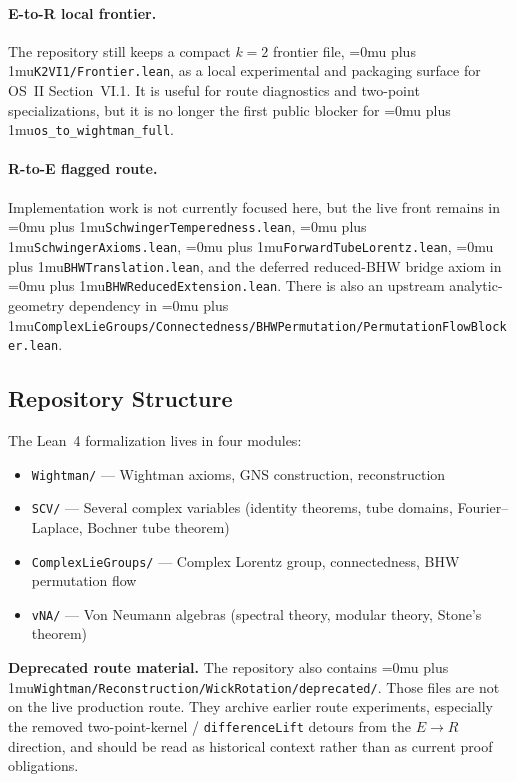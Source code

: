 \documentclass[11pt,a4paper]{article}
\newcommand{\leanfile}[1]{\begingroup\Urlmuskip=0mu plus 1mu\relax\nolinkurl{#1}\endgroup}
\newcommand{\leanname}[1]{\begingroup\Urlmuskip=0mu plus 1mu\relax\nolinkurl{#1}\endgroup}
\begin{document}
\paragraph{E-to-R local frontier.}
The repository still keeps a compact $k=2$ frontier file,
\leanfile{K2VI1/Frontier.lean}, as a local experimental and packaging surface
for OS~II Section~VI.1. It is useful for route diagnostics and two-point
specializations, but it is no longer the first public blocker for
\leanname{os\_to\_wightman\_full}.

\paragraph{R-to-E flagged route.}
Implementation work is not currently focused here, but the live front remains in
\leanfile{SchwingerTemperedness.lean}, \leanfile{SchwingerAxioms.lean},
\leanfile{ForwardTubeLorentz.lean}, \leanfile{BHWTranslation.lean}, and the
deferred reduced-BHW bridge axiom in \leanfile{BHWReducedExtension.lean}.
There is also an upstream analytic-geometry dependency in
\leanfile{ComplexLieGroups/Connectedness/BHWPermutation/PermutationFlowBlocker.lean}.

\subsection{Repository Structure}

The Lean~4 formalization lives in four modules:
\begin{itemize}
\item \texttt{Wightman/} --- Wightman axioms, GNS construction, reconstruction
\item \texttt{SCV/} --- Several complex variables (identity theorems, tube domains,
  Fourier--Laplace, Bochner tube theorem)
\item \texttt{ComplexLieGroups/} --- Complex Lorentz group, connectedness,
  BHW permutation flow
\item \texttt{vNA/} --- Von Neumann algebras (spectral theory, modular theory,
  Stone's theorem)
\end{itemize}

\medskip\noindent
\textbf{Deprecated route material.}
The repository also contains
\leanfile{Wightman/Reconstruction/WickRotation/deprecated/}. Those files are
not on the live production route. They archive earlier route experiments,
especially the removed two-point-kernel / \texttt{differenceLift} detours from
the $E \to R$ direction, and should be read as historical context rather than as
current proof obligations.
\end{document}
